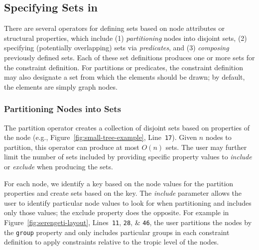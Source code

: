 \subsection{Specifying Sets in \projectname}
There are several operators for defining sets based on node attributes 
or structural properties, which include (1) \emph{partitioning} nodes 
into disjoint sets, (2) specifying (potentially overlapping) sets via
\emph{predicates},
and (3) \emph{composing} previously defined sets. Each of these set
definitions produces one or more sets for the constraint definition. For
partitions or predicates, the constraint definition may also 
designate a set from which the elements should be drawn; by default, the
elements are simply graph nodes.

\subsubsection{Partitioning Nodes into Sets}




The partition operator creates a collection of disjoint sets based on
properties of the node
(e.g., Figure~\ref{fig:small-tree-example}, Line~\texttt{17}).
Given $n$ nodes to partition, this operator can produce at most $O(n)$ 
sets. The user may further limit 
the number of sets included by providing specific property values to 
\emph{include} or \emph{exclude} when producing the sets.

For each node, we identify a key based on the node values for the partition
properties and create sets based on the key. The \emph{include} parameter allows
the user to identify particular node values to look for when partitioning
and includes only those values; the exclude property does the opposite. 
For example in Figure~\ref{fig:serengeti-layout}, Lines~\texttt{11}, \texttt{28},
\& \texttt{46}, the user partitions the nodes by the \texttt{group} property
and only includes particular groups in each constraint definition to apply
constraints relative to the tropic level of the nodes.

